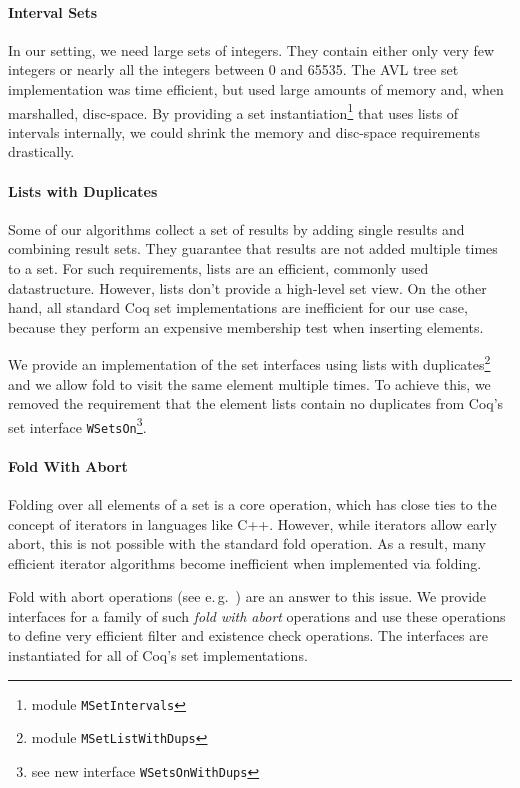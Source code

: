 \documentclass[a4paper,10pt,oneside]{article}
\newcommand{\code}[1]{\texttt{#1}}
\begin{document}
\paragraph{Interval Sets}
In our setting, we need large sets of integers. They contain either
only very few integers or nearly all the integers between 0 and
65535. The AVL
tree set implementation was time efficient, but used large amounts of
memory and, when marshalled, disc-space.  By providing a set
instantiation\footnote{module \code{MSetIntervals}} that uses lists of
intervals internally, we could shrink the memory and disc-space
requirements drastically.


\paragraph{Lists with Duplicates}
Some of our algorithms collect a set of results by adding single
results and combining result sets. They guarantee that results are not
added multiple times to a set. For such requirements, lists are an
efficient, commonly used datastructure. However, lists don't provide a
high-level set view. On the other hand, all standard Coq set
implementations are inefficient for our use case, because they perform
an expensive membership test when inserting elements.

We provide an implementation of the set interfaces using lists with
duplicates\footnote{module \code{MSetListWithDups}} and we allow
fold to visit the same element multiple times.  To achieve
this, we removed the requirement that the element lists contain no
duplicates from Coq's set interface \code{WSetsOn}\footnote{see new
  interface \code{WSetsOnWithDups}}.


\paragraph{Fold With Abort}
Folding over all elements of a set is a core operation, which has
close ties to the concept of iterators in languages like C++. However,
while iterators allow early abort, this is not possible with
the standard fold operation. As a result, many efficient iterator
algorithms become inefficient when implemented via folding.

Fold with abort operations (see e.\,g.~\cite{lammich10itp}) are an
answer to this issue.  We provide interfaces for a family of such
\emph{fold with abort} operations and use these operations to define
very efficient filter and existence check operations. The interfaces
are instantiated for all of Coq's set implementations.
\end{document}
